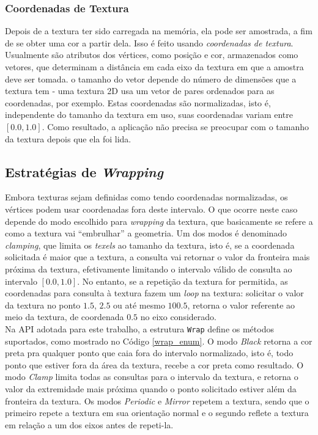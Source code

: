 \subsubsection{Coordenadas de Textura}

Depois de a textura ter sido carregada na memória, ela pode ser amostrada, a fim de se obter uma cor a partir dela. Isso é feito usando \emph{coordenadas de textura}. Usualmente são atributos dos vértices, como posição e cor, armazenados como vetores, que determinam a distância em cada eixo da textura em que a amostra deve ser tomada. o tamanho do vetor depende do número de dimensões que a textura tem - uma textura 2D usa um vetor de pares ordenados para as coordenadas, por exemplo. Estas coordenadas são normalizadas, isto é, independente do tamanho da textura em uso, suas coordenadas variam entre $[0.0, 1.0]$. Como resultado, a aplicação não precisa se preocupar com o tamanho da textura depois que ela foi lida. 

\subsection{Estratégias de \emph{Wrapping}}
Embora texturas sejam definidas como tendo coordenadas normalizadas, os vértices podem usar coordenadas fora deste intervalo. O que ocorre neste caso depende do modo escolhido para {\it wrapping} da textura, que basicamente se refere a como a textura vai ``embrulhar'' a geometria. Um dos modos é denominado \emph{clamping}, que limita os {\it texels} ao tamanho da textura, isto é, se a coordenada solicitada é maior que a textura, a consulta vai retornar o valor da fronteira mais próxima da textura, efetivamente limitando o intervalo válido de consulta ao intervalo $[0.0, 1.0]$. No entanto, se a repetição da textura for permitida, as coordenadas para consulta à textura fazem um \emph{loop} na textura: solicitar o valor da textura no ponto $1.5$, $2.5$ ou até mesmo $100.5$, retorna o valor referente ao meio da textura, de coordenada $0.5$ no eixo considerado. \\

Na API adotada para este trabalho, a estrutura \texttt{Wrap} define os métodos suportados, como mostrado no Código \ref{wrap_enum}. O modo \emph{Black} retorna a cor preta pra qualquer ponto que caia fora do intervalo normalizado, isto é, todo ponto que estiver fora da área da textura, recebe a cor preta como resultado. O modo \emph{Clamp} limita todas as consultas para o intervalo da textura, e retorna o valor da extremidade mais próxima quando o ponto solicitado estiver além da fronteira da textura. Os modos \emph{Periodic} e \emph{Mirror} repetem a textura, sendo que o primeiro repete a textura em sua orientação normal e o segundo reflete a textura em relação a um dos eixos antes de repeti-la.

